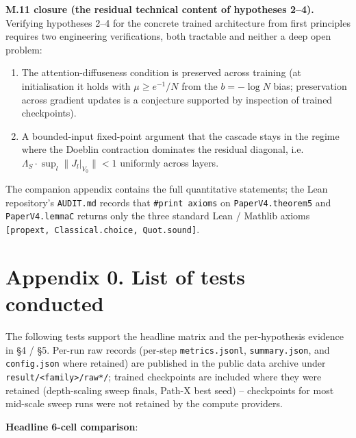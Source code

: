 \documentclass[11pt,a4paper]{article}
\theoremstyle{plain}
\theoremstyle{definition}
\begin{document}
\textbf{M.11 closure (the residual technical content of hypotheses 2--4).} Verifying hypotheses 2--4 for the concrete trained architecture from first principles requires two engineering verifications, both tractable and neither a deep open problem:

\begin{enumerate}
  \item The attention-diffuseness condition is preserved across training (at initialisation it holds with $\mu \ge e^{-1}/N$ from the $b = -\log N$ bias; preservation across gradient updates is a conjecture supported by inspection of trained checkpoints).
  \item A bounded-input fixed-point argument that the cascade stays in the regime where the Doeblin contraction dominates the residual diagonal, i.e.\ $\Lambda_S \cdot \sup_l \|J_l|_{V_0}\| < 1$ uniformly across layers.
\end{enumerate}

The companion appendix contains the full quantitative statements; the Lean repository's \texttt{AUDIT.md} records that \texttt{\#print axioms} on \texttt{PaperV4.theorem5} and \texttt{PaperV4.lemmaC} returns only the three standard Lean / Mathlib axioms \texttt{[propext, Classical.choice, Quot.sound]}.

\medskip

\section*{Appendix 0. List of tests conducted}
The following tests support the headline matrix and the per-hypothesis evidence in \S{}4 / \S{}5. Per-run raw records (per-step \texttt{metrics.jsonl}, \texttt{summary.json}, and \texttt{config.json} where retained) are published in the public data archive under \texttt{result/<family>/raw*/}; trained checkpoints are included where they were retained (depth-scaling sweep finals, Path-X best seed) -- checkpoints for most mid-scale sweep runs were not retained by the compute providers.

\textbf{Headline 6-cell comparison}:
\end{document}
